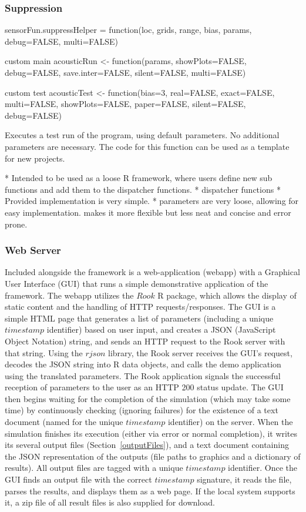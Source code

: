 \subsubsection{Suppression}
sensorFun.suppressHelper = function(loc, grids, range, bias, params, debug=FALSE, multi=FALSE) {

custom main
acousticRun <- function(params, showPlots=FALSE, debug=FALSE, save.inter=FALSE, silent=FALSE, multi=FALSE) {

custom test
acousticTest <- function(bias=3, real=FALSE, exact=FALSE, multi=FALSE, showPlots=FALSE, paper=FALSE, silent=FALSE, debug=FALSE) {
	Executes a test run of the program, using default parameters.  No additional 
	parameters are necessary. The code for this function can be used as a template for new projects.


* Intended to be used as a loose R framework, where users define new sub functions and add them to the dispatcher functions.
* dispatcher functions
* Provided implementation is very simple.
* parameters are very loose, allowing for easy implementation. makes it more flexible but less neat and concise and error prone.

\subsubsection{Web Server}
Included alongside the framework is a web-application (webapp) with a Graphical User Interface (GUI) that runs a simple demonstrative application of the framework.  The webapp utilizes the $Rook$ R package, which allows the display of static content and the handling of HTTP requests/responses.  The GUI is a simple HTML page that generates a list of parameters (including a unique $timestamp$ identifier) based on user input, and creates a JSON (JavaScript Object Notation) string, and sends an HTTP request to the Rook server with that string.  Using the $rjson$ library, the Rook server receives the GUI's request, decodes the JSON string into R data objects, and calls the demo application using the translated parameters.  The Rook application signals the successful reception of parameters to the user as an HTTP 200 status update.  The GUI then begins waiting for the completion of the simulation (which may take some time) by continuously checking (ignoring failures) for the existence of a text document (named for the unique $timestamp$ identifier) on the server.  When the simulation finishes its execution (either via error or normal completion), it writes its several output files (Section~\ref{outputFiles}), and a text document containing the JSON representation of the outputs (file paths to graphics and a dictionary of results).  All output files are tagged with a unique $timestamp$ identifier.  Once the GUI finds an output file with the correct $timestamp$ signature, it reads the file, parses the results, and displays them as a web page.  If the local system supports it, a zip file of all result files is also supplied for download.  


}}}
